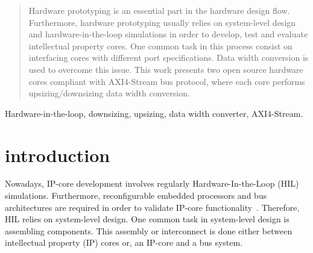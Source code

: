 \documentclass[10pt, conference, compsocconf]{IEEEtran}
\begin{document}




\maketitle


\begin{abstract}
Hardware prototyping is an essential part in the hardware design flow. Furthermore, hardware prototyping usually relies on system-level design and hardware-in-the-loop simulations in order to develop, test and evaluate intellectual property cores. One common task in this process consist on interfacing cores with different port
specifications. Data width conversion is used to overcome this issue. This work presents two open source hardware cores compliant with AXI4-Stream bus protocol, where each core performs upsizing/downsizing data width conversion.


\end{abstract}

\begin{IEEEkeywords}
Hardware-in-the-loop, downsizing, upsizing, data width converter, AXI4-Stream. 

\end{IEEEkeywords}


%
\IEEEpeerreviewmaketitle



\section{introduction}

Nowadays, IP-core development involves regularly Hardware-In-the-Loop (HIL) simulations. Furthermore, reconfigurable embedded processors and bus architectures are required in order to validate IP-core functionality~\cite{autoVHDL}. Therefore, HIL relies on system-level design. One common task in system-level design is assembling components. This assembly or interconnect is done either between intellectual property (IP) cores or, an IP-core and a bus system.
\end{document}
